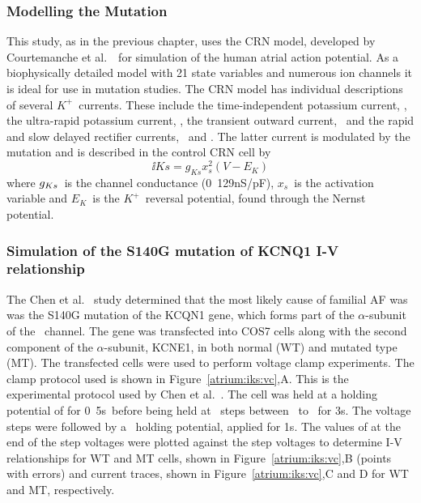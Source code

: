 \subsubsection{Modelling the Mutation}

This study, as in the previous chapter, uses the CRN model, developed by
Courtemanche et al.~\cite{CRN1998}\ for simulation of the human atrial action
potential.
As a biophysically detailed model with 21 state variables and numerous ion
channels it is ideal for use in mutation studies.
The CRN model has individual descriptions of several $K^{+}$\ currents.
These include the time-independent potassium current, , the ultra-rapid
potassium current, , the transient outward current, \ and the
rapid and slow delayed rectifier currents, \ and .
The latter current is modulated by the mutation and is described in the control
CRN cell by
\begin{equation}
\label{atrium:iks_con}
\ii{Ks} = g_{Ks}x_{s}^{2}\left(V-E_{K}\right)
\end{equation}
where $g_{\tiny{Ks}}$\ is the channel conductance (\unit{0.129}{nS/pF}), $x_{s}$\ is
the activation variable and $E_{K}$\ is the $K^{+}$\ reversal potential, found
through the Nernst potential.

\subsubsection{Simulation of the S140G mutation of KCNQ1 I-V relationship}

The Chen et al.~\cite{Chen2003} study determined that the most likely cause of
familial AF was was the S140G mutation of the KCQN1 gene, which forms part of
the $\alpha$-subunit of the \ channel.
The gene was transfected into COS7 cells along with the second component of
the $\alpha$-subunit, KCNE1, in both normal (WT) and mutated type (MT).
The transfected cells were used to perform voltage clamp experiments.
The clamp protocol used is shown in Figure~\ref{atrium:iks:vc},A.
This is the experimental protocol used by Chen et al.~\cite{Chen2003}.
The cell was held at a holding potential of  for \unit{0.5}{s}\ before
being held at \ steps between \ to \ for \unit{3}{s}.
The voltage steps were followed by a \ holding potential, applied for
\unit{1}{s}.
The values of  at the end of the step voltages were plotted against the
step voltages to determine  I-V relationships for WT
and MT cells, shown in Figure~\ref{atrium:iks:vc},B (points with errors) and
current traces, shown in Figure~\ref{atrium:iks:vc},C and D for WT and MT,
respectively.

